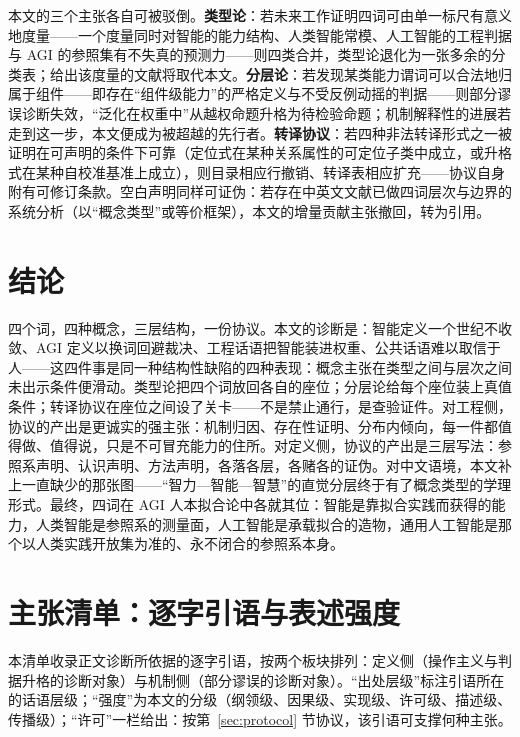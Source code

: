 \documentclass[10pt,fontset=fandol]{ctexart}
\begin{document}
本文的三个主张各自可被驳倒。\textbf{类型论}：若未来工作证明四词可由单一标尺有意义地度量——一个度量同时对智能的能力结构、人类智能常模、人工智能的工程判据与 AGI 的参照集有不失真的预测力——则四类合并，类型论退化为一张多余的分类表；给出该度量的文献将取代本文。\textbf{分层论}：若发现某类能力谓词可以合法地归属于组件——即存在“组件级能力”的严格定义与不受反例动摇的判据——则部分谬误诊断失效，“泛化在权重中”从越权命题升格为待检验命题；机制解释性的进展若走到这一步，本文便成为被超越的先行者。\textbf{转译协议}：若四种非法转译形式之一被证明在可声明的条件下可靠（定位式在某种关系属性的可定位子类中成立，或升格式在某种自校准基准上成立），则目录相应行撤销、转译表相应扩充——协议自身附有可修订条款。空白声明同样可证伪：若存在中英文文献已做四词层次与边界的系统分析（以“概念类型”或等价框架），本文的增量贡献主张撤回，转为引用。

\section{结论}

四个词，四种概念，三层结构，一份协议。本文的诊断是：智能定义一个世纪不收敛、AGI 定义以换词回避裁决、工程话语把智能装进权重、公共话语难以取信于人——这四件事是同一种结构性缺陷的四种表现：概念主张在类型之间与层次之间未出示条件便滑动。类型论把四个词放回各自的座位；分层论给每个座位装上真值条件；转译协议在座位之间设了关卡——不是禁止通行，是查验证件。对工程侧，协议的产出是更诚实的强主张：机制归因、存在性证明、分布内倾向，每一件都值得做、值得说，只是不可冒充能力的住所。对定义侧，协议的产出是三层写法：参照系声明、认识声明、方法声明，各落各层，各赌各的证伪。对中文语境，本文补上一直缺少的那张图——“智力—智能—智慧”的直觉分层终于有了概念类型的学理形式。最终，四词在 AGI 人本拟合论中各就其位：智能是靠拟合实践而获得的能力，人类智能是参照系的测量面，人工智能是承载拟合的造物，通用人工智能是那个以人类实践开放集为准的、永不闭合的参照系本身。




\appendix

\section{主张清单：逐字引语与表述强度}\label{app:catalog}

本清单收录正文诊断所依据的逐字引语，按两个板块排列：定义侧（操作主义与判据升格的诊断对象）与机制侧（部分谬误的诊断对象）。“出处层级”标注引语所在的话语层级；“强度”为本文的分级（纲领级、因果级、实现级、许可级、描述级、传播级）；“许可”一栏给出：按第~\ref{sec:protocol} 节协议，该引语可支撑何种主张。
\end{document}
